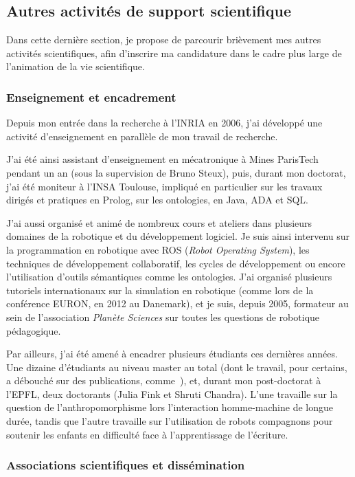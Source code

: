 \documentclass[a4paper]{article}
\begin{document}
\subsection{Autres activités de support scientifique}

Dans cette dernière section, je propose de parcourir brièvement mes autres
activités scientifiques, afin d'inscrire ma candidature dans le cadre plus large
de l'animation de la vie scientifique.

\subsubsection{Enseignement et encadrement}

Depuis mon entrée dans la recherche à l'INRIA en 2006, j'ai développé une
activité d'enseignement en parallèle de mon travail de recherche.

J'ai été ainsi assistant d'enseignement en mécatronique à Mines ParisTech
pendant un an (sous la supervision de Bruno Steux), puis, durant mon doctorat,
j'ai été moniteur à l'INSA Toulouse, impliqué en particulier sur les travaux
dirigés et pratiques en Prolog, sur les ontologies, en Java, ADA et SQL.

J'ai aussi organisé et animé de nombreux cours et ateliers dans plusieurs
domaines de la robotique et du développement logiciel. Je suis ainsi intervenu
sur la programmation en robotique avec ROS (\emph{Robot Operating System}), les
techniques de développement collaboratif, les cycles de développement ou encore
l'utilisation d'outils sémantiques comme les ontologies. J'ai organisé plusieurs
tutoriels internationaux sur la simulation en robotique (comme lors de la
conférence EURON, en 2012 au Danemark), et je suis, depuis 2005, formateur au
sein de l'association \emph{Planète Sciences} sur toutes les questions de
robotique pédagogique.

Par ailleurs, j'ai été amené à encadrer plusieurs étudiants ces dernières
années. Une dizaine d'étudiants au niveau master au total (dont le travail, pour
certains, a débouché sur des publications, comme~\cite{Lemaignan2011a}),
et, durant mon post-doctorat à l'EPFL, deux doctorants (Julia Fink et Shruti
Chandra). L'une travaille sur la question de l'anthropomorphisme lors
l'interaction homme-machine de longue durée, tandis que l'autre travaille sur
l'utilisation de robots compagnons pour soutenir les enfants en difficulté face
à l'apprentissage de l'écriture.

\subsubsection{Associations scientifiques et dissémination}
\end{document}
